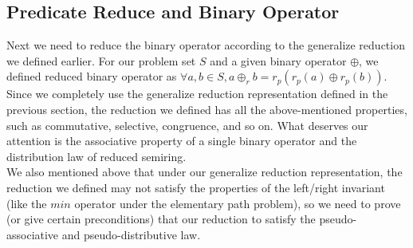 \documentclass[a4paper,10pt]{article}
\begin{document}
\subsection{Predicate Reduce and Binary Operator}
Next we need to reduce the binary operator according to the generalize reduction we defined earlier. For our problem set $S$ and a given binary operator $\oplus$, we defined reduced binary operator as $\forall a,b \in S, a \oplus_r b = r_p (r_p(a) \oplus r_p(b))$.\\
Since we completely use the generalize reduction representation defined in the previous section, the reduction we defined has all the above-mentioned properties, such as commutative, selective, congruence, and so on. What deserves our attention is the associative property of a single binary operator and the distribution law of reduced semiring.\\
We also mentioned above that under our generalize reduction representation, the reduction we defined may not satisfy the properties of the left/right invariant (like the $min$ operator under the elementary path problem), so we need to prove (or give certain preconditions) that our reduction to satisfy the pseudo-associative and pseudo-distributive law.\\
\end{document}
